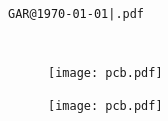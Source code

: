 \documentclass[a4paper,12pt]{scrartcl}
\begin{document}

\renewcommand{\tablename}{Tab.}


\iftitlepage
  
  \maketitle

  \thispagestyle{empty}
  \newpage

  \ifblankpageaftertitlepage
    ~
    \thispagestyle{empty}
    \newpage
  \fi
\fi

\ifsoftwarepage
  

  \thispagestyle{empty}
  \newpage
\fi

\section*{\abstracttitle}
\abstracttext

\thispagestyle{empty}
\newpage

\setcounter{page}{1}

\noindent\hfill\texttt{GAR@\today|\jobname.pdf}
\vspace{-25pt}

\section{\pcbsectiontitle}

\begin{figure}[!htbp]
  \vspace{-20pt}
  \centering
  \texttt{[image: pcb.pdf]}
  \caption{\pcbfigureassemblytopcaptiontext}
  \label{fig:pcb-top-assembly}
\end{figure}
\newpage

\begin{figure}[!htbp]
  \centering
  \texttt{[image: pcb.pdf]}
  \caption{\pcbfigureassemblybottomcaptiontext}
  \label{fig:pcb-bottom-assembly}
\end{figure}
\newpage

\section{\programmersectiontitle}
\end{document}
